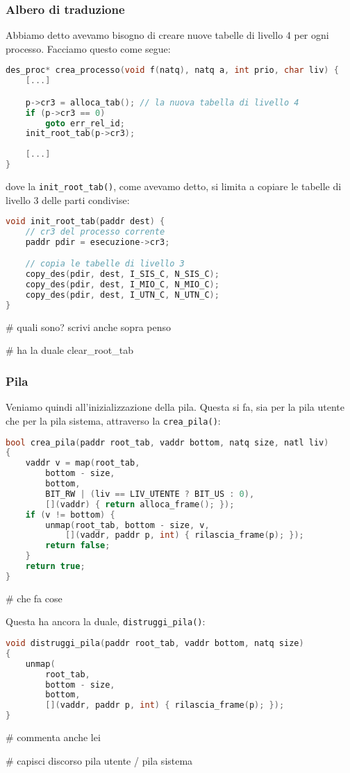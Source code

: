 \documentclass[a4paper,11pt]{article}
\begin{document}
\subsubsection{Albero di traduzione}
Abbiamo detto avevamo bisogno di creare nuove tabelle di livello 4 per ogni processo.
Facciamo questo come segue:
\begin{lstlisting}[language=C++, style=codestyle]	
des_proc* crea_processo(void f(natq), natq a, int prio, char liv) {
	[...]

	p->cr3 = alloca_tab(); // la nuova tabella di livello 4
	if (p->cr3 == 0)
		goto err_rel_id;
	init_root_tab(p->cr3);
	
	[...]
}
\end{lstlisting}
dove la \lstinline|init_root_tab()|, come avevamo detto, si limita a copiare le tabelle di livello 3 delle parti condivise:
\begin{lstlisting}[language=C++, style=codestyle]	
void init_root_tab(paddr dest) {
	// cr3 del processo corrente
	paddr pdir = esecuzione->cr3;

	// copia le tabelle di livello 3
	copy_des(pdir, dest, I_SIS_C, N_SIS_C);
	copy_des(pdir, dest, I_MIO_C, N_MIO_C);
	copy_des(pdir, dest, I_UTN_C, N_UTN_C);
}
\end{lstlisting} # quali sono? scrivi anche sopra penso

# ha la duale clear_root_tab

\subsubsection{Pila}
Veniamo quindi all'inizializzazione della pila.
Questa si fa, sia per la pila utente che per la pila sistema, attraverso la \lstinline|crea_pila()|:
\begin{lstlisting}[language=C++, style=codestyle]	
bool crea_pila(paddr root_tab, vaddr bottom, natq size, natl liv)
{
	vaddr v = map(root_tab,
		bottom - size,
		bottom,
		BIT_RW | (liv == LIV_UTENTE ? BIT_US : 0),
		[](vaddr) { return alloca_frame(); });
	if (v != bottom) {
		unmap(root_tab, bottom - size, v,
			[](vaddr, paddr p, int) { rilascia_frame(p); });
		return false;
	}
	return true;
}
\end{lstlisting}
# che fa cose

Questa ha ancora la duale, \lstinline|distruggi_pila()|:
\begin{lstlisting}[language=C++, style=codestyle]	
void distruggi_pila(paddr root_tab, vaddr bottom, natq size)
{
	unmap(
		root_tab,
		bottom - size,
		bottom,
		[](vaddr, paddr p, int) { rilascia_frame(p); });
}
\end{lstlisting}

# commenta anche lei

# capisci discorso pila utente / pila sistema
\end{document}
